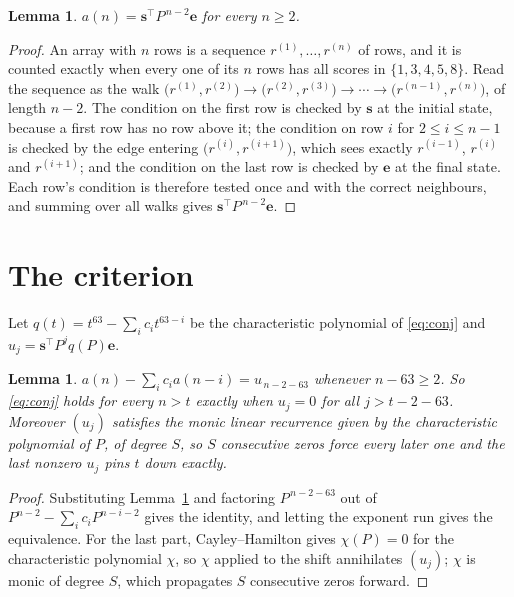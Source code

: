 \documentclass[11pt,a4paper]{article}
\theoremstyle{plain}
\newtheorem{lemma}[theorem]{Lemma}
\theoremstyle{definition}
\begin{document}
\begin{lemma}\label{lem:walk}
$a(n)=\mathbf{s}^{\!\top}P^{\,n-2}\mathbf{e}$ for every $n\ge2$.
\end{lemma}

\begin{proof}
An array with $n$ rows is a sequence $r^{(1)},\dots,r^{(n)}$ of rows, and it is counted
exactly when every one of its $n$ rows has all scores in $\{1,3,4,5,8\}$. Read the sequence as the
walk $\bigl(r^{(1)},r^{(2)}\bigr)\to\bigl(r^{(2)},r^{(3)}\bigr)\to\cdots\to
\bigl(r^{(n-1)},r^{(n)}\bigr)$, of length $n-2$. The condition on the first row is
checked by $\mathbf{s}$ at the initial state, because a first row has no row above it; the
condition on row $i$ for $2\le i\le n-1$ is checked by the edge entering
$\bigl(r^{(i)},r^{(i+1)}\bigr)$, which sees exactly $r^{(i-1)}$, $r^{(i)}$ and
$r^{(i+1)}$; and the condition on the last row is checked by $\mathbf{e}$ at the final
state. Each row's condition is therefore tested once and with the correct neighbours, and
summing over all walks gives $\mathbf{s}^{\!\top}P^{\,n-2}\mathbf{e}$.
\end{proof}

\section{The criterion}

Let $q(t)=t^{63}-\sum_i c_i t^{63-i}$ be the characteristic polynomial of
\eqref{eq:conj} and $u_j=\mathbf{s}^{\!\top}P^{j}q(P)\mathbf{e}$.

\begin{lemma}\label{lem:crit}
$a(n)-\sum_i c_i a(n-i)=u_{\,n-2-63}$ whenever $n-63\ge2$. So \eqref{eq:conj}
holds for every $n>t$ exactly when $u_j=0$ for all $j>t-2-63$. Moreover $(u_j)$
satisfies the monic linear recurrence given by the characteristic polynomial of $P$, of
degree $S$, so $S$ consecutive zeros force every later one and the last nonzero $u_j$ pins
$t$ down exactly.
\end{lemma}

\begin{proof}
Substituting Lemma~\ref{lem:walk} and factoring $P^{\,n-2-63}$ out of
$P^{n-2}-\sum_i c_i P^{n-i-2}$ gives the identity, and letting the exponent run gives the
equivalence. For the last part, Cayley--Hamilton gives $\chi(P)=0$ for the characteristic
polynomial $\chi$, so $\chi$ applied to the shift annihilates $(u_j)$; $\chi$ is monic of
degree $S$, which propagates $S$ consecutive zeros forward.
\end{proof}
\end{document}
